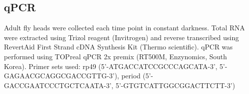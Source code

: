\subsection*{qPCR}

Adult fly heads were collected each time point in constant darkness.
Total RNA were extracted using Trizol reagent (Invitrogen) and reverse transcribed using RevertAid First Strand cDNA Synthesis Kit (Thermo scientific).
qPCR was performed using TOPreal qPCR 2x premix (RT500M, Enzynomics, South Korea).
Primer sets used: rp49 (5'-ATGACCATCCGCCCAGCATA-3', 5'-GAGAACGCAGGCGACCGTTG-3'), period (5'-GACCGAATCCCTGCTCAATA-3', 5'-GTGTCATTGGCGGACTTCTT-3') 
    